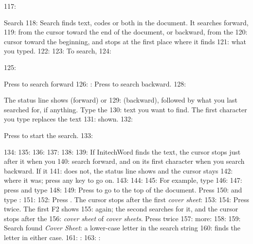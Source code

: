 117: \begin{Feature}{Search}
118: Search finds text, codes or both in the document.  It searches forward,
119: from the cursor toward the end of the document, or backward, from the
120: cursor toward the beginning, and stops at the first place where it finds
121: what you typed.
122: 
123: To search,
124: \begin{WPSteps}
125: \item Press  to search forward
126: : Press  to search backward.
128: \item The status line shows  (forward) or 
129: (backward), followed by what you last searched for, if anything.  Type the
130: text you want to find.  The first character you type replaces the text
131: shown.
132: \item Press  to start the search.
133: \end{WPSteps}
134: 
135: 
136: 
137: 
138: 
139: If InitechWord finds the text, the cursor stops just after it when you
140: search forward, and on its first character when you search backward.  If it
141: does not, the status line shows  and the cursor stays
142: where it was; press any key to go on.
143: 
144: 
145: For example, type
146: 
147: press  and type
148: 
149: Press  to go to the top of the document.  Press
150:  and type :
151: 
152: Press .  The cursor stops after the first \textit{cover sheet}:
153: 
154: Press  twice.  The first F2 shows 
155: again; the second searches for it, and the cursor stops after the
156: \textit{cover sheet} of \textit{cover sheets}.  Press  twice
157: more:
158: 
159: Search found \textit{Cover Sheet}: a lower-case letter in the search string
160: finds the letter in either case.
161: : 
163: : 

\end{Feature}
